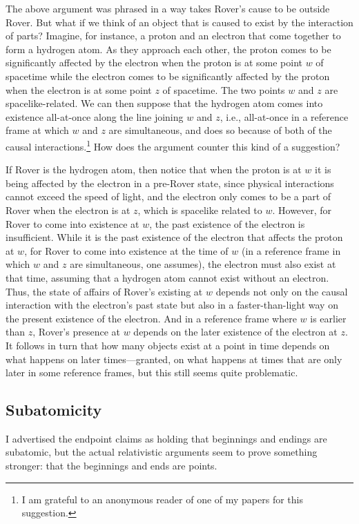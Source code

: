 The above argument was phrased in a way takes Rover's cause to be outside Rover. But what if we think of an object that is caused to exist by the interaction of parts? Imagine, for instance, a proton and an electron that come together to form a hydrogen atom. As they approach each other, the proton comes to be significantly affected by the electron when the proton is at some point $w$ of spacetime while the electron comes to be significantly affected by the proton when the electron is at some point $z$ of spacetime. The two points $w$ and $z$ are spacelike-related. We can then suppose that the hydrogen atom comes into existence all-at-once along the line joining $w$ and $z$, i.e., all-at-once in a reference frame at which $w$ and $z$ are simultaneous, and does so because of both of the causal interactions.\footnote{I am grateful to an
anonymous reader of one of my papers for this suggestion.}  How does the argument counter this kind of a suggestion?

If Rover is the hydrogen atom, then notice that when the proton is at $w$ it is being affected by the electron in a pre-Rover state, since physical interactions cannot exceed the speed of light, and the electron only comes to be a part of Rover when the electron is at $z$, which is spacelike related to $w$. However, for Rover to come into existence at $w$, the past existence of the electron is insufficient. While it is the past existence of the electron that affects the proton at $w$, for Rover to come into existence at the time of $w$ (in a reference frame in which $w$ and $z$ are simultaneous, one assumes), the electron must also exist at that time, assuming that a hydrogen atom cannot exist without an electron.  Thus, the state of affairs of Rover's existing at $w$ depends not only on the causal interaction with the electron’s past state but also in a faster-than-light way on the present existence of the electron. And in a reference frame where $w$ is earlier than $z$, Rover’s presence at $w$ depends on the later existence of the electron at $z$. It follows in turn that how many objects exist at a point in time depends on what happens on later times—granted, on what happens at times that are only later in some reference frames, but this still seems quite problematic.

\subsection{Subatomicity}
I advertised the endpoint claims as holding that beginnings and endings are subatomic, but the actual relativistic 
arguments seem to prove something stronger: that the beginnings and ends are points.


